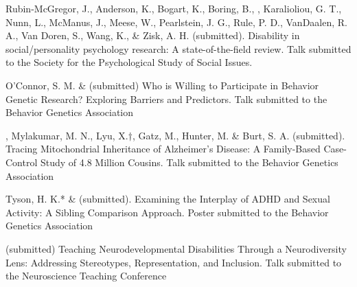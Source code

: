 

\item Rubin-McGregor, J., Anderson, K., Bogart, K., Boring, B., \meb, Karalioliou, G. T., Nunn, L., McManus, J., Meese, W., Pearlstein, J. G., Rule, P. D., VanDaalen, R. A., Van Doren, S., Wang, K., & Zisk, A. H. (submitted). Disability in social/personality psychology research: A state-of-the-field review. Talk submitted to the Society for the Psychological Study of Social Issues. 

\item O'Connor, S. M. \& \meb (submitted) Who is Willing to Participate in Behavior Genetic Research? Exploring Barriers and Predictors. Talk submitted to the Behavior Genetics Association
\item \meb, Mylakumar, M. N., Lyu, X.$\dagger$, Gatz, M., Hunter, M. \& Burt, S. A. (submitted). Tracing Mitochondrial Inheritance of Alzheimer's Disease: A Family-Based Case-Control Study of 4.8 Million Cousins. Talk submitted to the Behavior Genetics Association
\item Tyson, H. K.* \& \meb (submitted). Examining the Interplay of ADHD and Sexual Activity: A Sibling Comparison Approach. Poster submitted to the Behavior Genetics Association

\item \meb (submitted) Teaching Neurodevelopmental Disabilities Through a Neurodiversity Lens: Addressing Stereotypes, Representation, and Inclusion.  Talk submitted to the Neuroscience Teaching Conference


